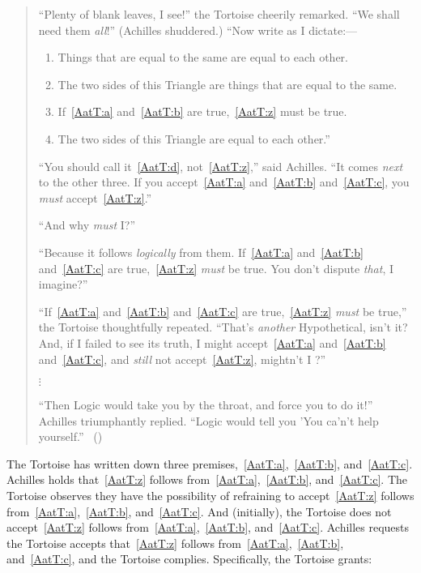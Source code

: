 \begin{note}
  \begin{quote}
    ``Plenty of blank leaves, I see!'' the Tortoise cheerily remarked.
    ``We shall need them \emph{all}!''
    (Achilles shuddered.)
    ``Now write as I dictate:---

    \begin{enumerate}[label=(\emph{\Alph*}), ref=\emph{\Alph*}]
    \item
      \label{AatT:a}
      Things that are equal to the same are equal to each other.
    \item
      \label{AatT:b}
      The two sides of this Triangle are things that are equal to the same.
    \item
      \label{AatT:c}
      If~\ref{AatT:a} and~\ref{AatT:b} are true,~\ref{AatT:z} must be true.
      \setcounter{enumi}{25}
    \item
      \label{AatT:z}
      The two sides of this Triangle are equal to each other.''
    \end{enumerate}

    ``You should call it~\ref{AatT:d}, not~\ref{AatT:z},'' said Achilles.
    ``It comes \emph{next} to the other three.
    If you accept~\ref{AatT:a} and~\ref{AatT:b} and~\ref{AatT:c}, you \emph{must} accept~\ref{AatT:z}.''

    ``And why \emph{must} I?''

    ``Because it follows \emph{logically} from them.
    If~\ref{AatT:a} and~\ref{AatT:b} and~\ref{AatT:c} are true,~\ref{AatT:z} \emph{must} be true.
    You don't dispute \emph{that}, I imagine?''

    ``If~\ref{AatT:a} and~\ref{AatT:b} and~\ref{AatT:c} are true,~\ref{AatT:z} \emph{must} be true,'' the Tortoise thoughtfully repeated.
    ``That's \emph{another} Hypothetical, isn't it?
    And, if I failed to see its truth, I might accept~\ref{AatT:a} and~\ref{AatT:b} and~\ref{AatT:c}, and \emph{still} not accept~\ref{AatT:z}, mightn't I ?''

    \mbox{}\hfill\(\vdots\)\hfill\mbox{}

    ``Then Logic would take you by the throat, and force you to do it!''
    Achilles triumphantly replied.
    ``Logic would tell you 'You ca'n't help yourself.''%
    \mbox{ }\hfill\mbox{(\Citeyear[279--280]{Carroll:1895uj})}
  \end{quote}

  The Tortoise has written down three premises,~\ref{AatT:a},~\ref{AatT:b}, and~\ref{AatT:c}.
  Achilles holds that~\ref{AatT:z} follows from~\ref{AatT:a},~\ref{AatT:b}, and~\ref{AatT:c}.
  The Tortoise observes they have the possibility of refraining to accept~\ref{AatT:z} follows from~\ref{AatT:a},~\ref{AatT:b}, and~\ref{AatT:c}.
  And (initially), the Tortoise does not accept~\ref{AatT:z} follows from~\ref{AatT:a},~\ref{AatT:b}, and~\ref{AatT:c}.
  Achilles requests the Tortoise accepts that~\ref{AatT:z} follows from~\ref{AatT:a},~\ref{AatT:b}, and~\ref{AatT:c}, and the Tortoise complies.
  Specifically, the Tortoise grants:


\end{note}
